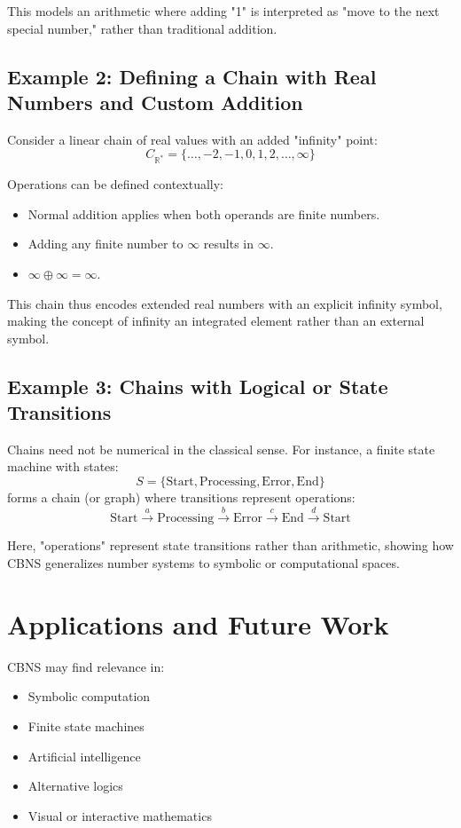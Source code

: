 \documentclass{article}
\begin{document}
This models an arithmetic where adding "1" is interpreted as "move to the next special number," rather than traditional addition.

\subsection{Example 2: Defining a Chain with Real Numbers and Custom Addition}

Consider a linear chain of real values with an added "infinity" point:
\[
C_{\mathbb{R}^*} = \{ \dots, -2, -1, 0, 1, 2, \dots, \infty \}
\]

Operations can be defined contextually:

\begin{itemize}
  \item Normal addition applies when both operands are finite numbers.
  \item Adding any finite number to \(\infty\) results in \(\infty\).
  \item \(\infty \oplus \infty = \infty\).
\end{itemize}

This chain thus encodes extended real numbers with an explicit infinity symbol, making the concept of infinity an integrated element rather than an external symbol.

\subsection{Example 3: Chains with Logical or State Transitions}

Chains need not be numerical in the classical sense. For instance, a finite state machine with states:
\[
S = \{\text{Start}, \text{Processing}, \text{Error}, \text{End}\}
\]
forms a chain (or graph) where transitions represent operations:
\[
\text{Start} \xrightarrow{a} \text{Processing} \xrightarrow{b} \text{Error} \xrightarrow{c} \text{End} \xrightarrow{d} \text{Start}
\]

Here, "operations" represent state transitions rather than arithmetic, showing how CBNS generalizes number systems to symbolic or computational spaces.

\section{Applications and Future Work}
CBNS may find relevance in:
\begin{itemize}
    \item Symbolic computation
    \item Finite state machines
    \item Artificial intelligence
    \item Alternative logics
    \item Visual or interactive mathematics
\end{itemize}
\end{document}
